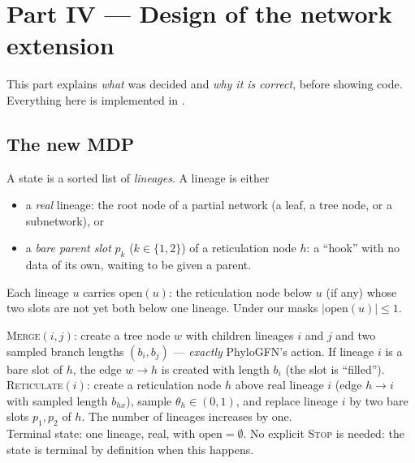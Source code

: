 \section{Part IV --- Design of the network extension}

This part explains \emph{what} was decided and \emph{why it is correct}, before showing code. Everything here is implemented in .

\subsection{The new MDP}
\begin{defbox}[State]
A state is a sorted list of \emph{lineages}. A lineage is either
\begin{itemize}[nosep]
\item a \emph{real} lineage: the root node of a partial network (a leaf, a tree node, or a subnetwork), or
\item a \emph{bare parent slot} $p_k$ ($k\in\{1,2\}$) of a reticulation node $h$: a ``hook'' with no data of its own, waiting to be given a parent.
\end{itemize}
Each lineage $u$ carries $\mathrm{open}(u)$: the reticulation node below $u$ (if any) whose two slots are not yet both below one lineage. Under our masks $|\mathrm{open}(u)|\le1$.
\end{defbox}

\begin{defbox}[Actions]
\textsc{Merge}$(i,j)$: create a tree node $w$ with children lineages $i$ and $j$ and two sampled branch lengths $(b_i,b_j)$ --- \emph{exactly} PhyloGFN's action. If lineage $i$ is a bare slot of $h$, the edge $w\to h$ is created with length $b_i$ (the slot is ``filled'').\\[2pt]
\textsc{Reticulate}$(i)$: create a reticulation node $h$ above real lineage $i$ (edge $h\to i$ with sampled length $b_{hx}$), sample $\theta_h\in(0,1)$, and replace lineage $i$ by two bare slots $p_1,p_2$ of $h$. The number of lineages increases by one.\\[2pt]
Terminal state: one lineage, real, with $\mathrm{open}=\emptyset$. No explicit \textsc{Stop} is needed: the state is terminal by definition when this happens.
\end{defbox}

